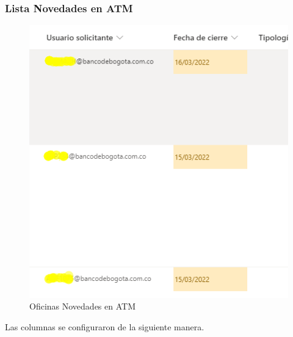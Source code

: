 \subsubsection{Lista Novedades en ATM}
\begin{figure}[H]
	\centering
	\includegraphics[scale=0.37]{Capitulo3/imagenes/7.png}
	\caption{Oficinas Novedades en ATM}
	\label{ListaNovedadesEnATM2}
\end{figure}

Las columnas se configuraron de la siguiente manera.

